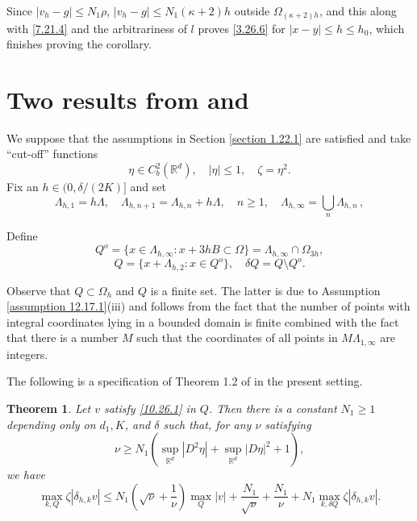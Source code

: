 \documentclass[11pt, reqno]{amsart}
\newtheorem{theorem}{Theorem}[section]
\theoremstyle{definition}
\theoremstyle{remark}
\begin{document}
 

Since
  $|v_{h}-g|\leq N_{1}\rho$,
$|v_{h}-g|\leq  N_{1}(\kappa+2) h$ outside $\Omega_{(\kappa+2)h}$,
and this along with \eqref{7.21.4} and the arbitrariness
of $l$ proves \eqref{3.26.6} for $|x-y|\leq h\leq h_{0}$,
which
finishes proving the corollary.

{\section{{Two results from \protect\cite{Kr12.1} and 
\protect\cite{Kr12.2}}}
      \setcounter{equation}{0}}
                                          \label{section 7.4.1}

We suppose that the assumptions in Section
\ref{section 1.22.1} are satisfied and
take ``cut-off'' functions 
$$
\eta\in C^{2}_{b}({\mathbb{R}}^{d}),\quad |\eta|\leq1,
\quad \zeta=\eta^{2}.
$$
 Fix an $h\in(0,\delta/(2K)]$ and 
set
$$
\Lambda_{h,1}=h\Lambda,\quad \Lambda_{h,n+1}= 
 \Lambda_{h,n}+h\Lambda ,\quad n\geq1,
\quad \Lambda_{h,\infty}=\bigcup_{n}\Lambda_{h,n}\,,
$$
 
Define
$$
Q^{o}=\{ x\in\Lambda_{h,\infty}:
x+3hB 
\subset \Omega\}=\Lambda_{h,\infty}\cap\Omega_{3h},
$$
$$
Q=\{x+\Lambda_{h,2}:x\in Q^{o}\},
\quad \delta   Q=Q\setminus Q^{o}   .
$$
 
Observe that $Q\subset\Omega_{h}$ and $Q$ is a finite set.
 The latter is due
to Assumption \ref{assumption 12.17.1}(iii) and follows from 
the fact that the number of points with integral coordinates
lying in a  bounded domain
is finite combined with the fact that there is a number
$M$ such that the coordinates of all points in 
$M\Lambda_{1,\infty}$
are integers. 
 
The following is a specification of Theorem  1.2
of \cite{Kr12.1} in the present setting.

\begin{theorem}
                                         \label{theorem 8.1.1}
Let $v$ satisfy \eqref{10.26.1}
in $Q $.
Then there is a constant $N_{1}\geq1$
depending only on $ d_{1},K$,  and $\delta$
such that, for any $\nu$ satisfying
$$ 
\nu\geq N_{1} (\sup_{{\mathbb{R}}^{d}}|D^{2}\eta|
+ \sup_{{\mathbb{R}}^{d}}|D \eta|^{2}+1),
$$
we have 
\begin{equation}
                                           \label{12.27.07}
\max_{k,Q}\zeta|\delta_{h,k}v|\leq N_{1}(\sqrt{\nu}
+\frac{1}{\nu}   ) \max_{Q}|v|+\frac{N_{1}}{\sqrt{\nu}} 
+\frac{N_{1}}{\nu} +N_{1}\max_{k,\delta Q}\zeta|\delta_{h,k}v|.
\end{equation}

\end{theorem}
\end{document}

